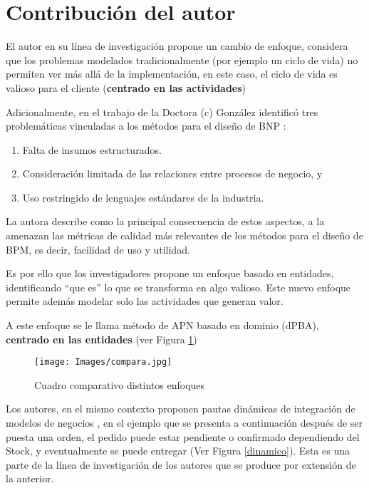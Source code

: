 \documentclass{article}
\begin{document}
\section{Contribución del autor}

El autor en su línea de investigación propone un cambio de enfoque, considera que los problemas modelados tradicionalmente (por ejemplo un ciclo de vida) no permiten ver más allá de la implementación, en este caso, el ciclo de vida es valioso para el cliente (\textbf{centrado en las actividades})

Adicionalmente, en el trabajo de la Doctora (c) González identificó tres problemáticas vinculadas a los métodos para el diseño de BNP \cite{lib1:T1}: 

\begin{enumerate}
\item Falta de insumos estructurados.
\item Consideración limitada de las relaciones entre procesos de negocio, y 
\item Uso restringido de lenguajes estándares de la industria.

 \end{enumerate}

La autora describe como la principal consecuencia de estos aspectos, a  la amenazan las métricas de calidad más relevantes de los métodos para el diseño de BPM, es decir, facilidad de uso y utilidad. 

Es por ello que los investigadores propone  un enfoque basado en entidades, identificando “que es” lo que se transforma en algo valioso. Este nuevo enfoque permite además modelar solo las actividades que generan valor.

A este enfoque se le llama método de APN basado en dominio (dPBA), \textbf{centrado en las entidades} (ver Figura \ref{enti})


\begin{figure}[H]
\texttt{[image: Images/compara.jpg]}
\centering
\caption{Cuadro comparativo distintos enfoques \cite{lib1:T1}}
\label{enti}
\end{figure}

Los autores, en el mismo contexto proponen pautas dinámicas de integración de modelos de negocios \cite{art1:a1}, en el ejemplo que se presenta a continuación después de ser puesta una orden, el pedido puede estar pendiente o confirmado dependiendo del Stock, y eventualmente se puede entregar (Ver Figura \ref{dinamico}). Esta es una parte de la línea de investigación de los autores que se produce por extensión de la anterior. 
\end{document}
